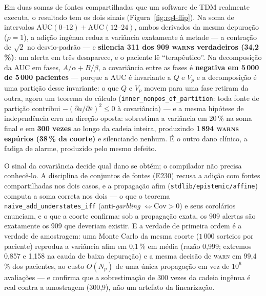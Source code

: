 Em duas somas de fontes compartilhadas que um software de TDM realmente executa, o
resultado tem os dois sinais (Figura~\ref{fig:rq4-flip}). Na soma de intervalos
$\mathrm{AUC}(0\text{--}12) + \mathrm{AUC}(12\text{--}24)$, ambos derivados da mesma
depuração ($\rho = 1$), a adição ingênua reduz a variância exatamente à metade --- a
contração de $\sqrt{2}$ no desvio-padrão --- e \textbf{silencia 311 dos 909 \textsc{warn}s
verdadeiros (34,2\,\%)}: um alerta em três desaparece, e o paciente lê ``terapêutico''.
Na decomposição da AUC em fases, $A/\alpha + B/\beta$, a covariância entre as fases é
\textbf{negativa em 5\,000 de 5\,000 pacientes} --- porque a AUC é invariante a $Q$ e $V_p$
e a decomposição é uma partição desse invariante: o que $Q$ e $V_p$ movem para uma fase
retiram da outra, agora um teorema do cálculo (\texttt{inner\_nonpos\_of\_partition}: toda
fonte de partição contribui $-(\partial a/\partial\varepsilon)^2 \leq 0$ à covariância)
--- e a mesma hipótese de independência erra na direção oposta: sobrestima a variância em
20\,\% na soma final e em \textbf{300 vezes} ao longo da cadeia inteira, produzindo
\textbf{1\,894 \textsc{warn}s espúrios (38\,\% da coorte)} e silenciando nenhum. É o outro
dano clínico, a fadiga de alarme, produzido pelo mesmo defeito.

O sinal da covariância decide qual dano se obtém; o compilador não precisa conhecê-lo. A
disciplina de conjuntos de fontes (E230) recusa a adição com fontes compartilhadas nos dois
casos, e a propagação afim (\texttt{stdlib/epistemic/affine}) computa a soma correta nos
dois --- o que o teorema \texttt{naive\_add\_understates\_iff} (anti-\emph{garbling}
$\Leftrightarrow \mathrm{Cov} > 0$) e seus corolários enunciam, e o que a coorte confirma:
sob a propagação exata, os 909 alertas são exatamente os 909 que deveriam existir. E a
verdade de primeira ordem é a verdade de amostragem: uma Monte Carlo da mesma coorte
($1\,000$ sorteios por paciente) reproduz a variância afim em 0,1\,\% em média (razão
0,999; extremos 0,857 e 1,158 na cauda de baixa depuração) e a mesma decisão de \textsc{warn}
em 99,4\,\% dos pacientes, ao custo $O(N_p)$ de uma única propagação em vez de $10^6$
avaliações --- e confirma que a sobrestimação de 300 vezes da cadeia ingênua é real contra
a amostragem (300,9), não um artefato da linearização.

